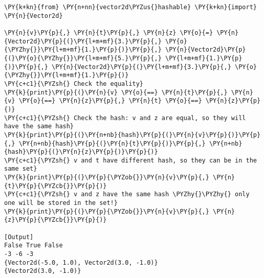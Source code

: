 \begin{Verbatim}[label=\makebox{\url{https://github.com/lucabaldini/cmepda/tree/master/slides/latex/snippets/vector2d\_hashable\_test.py}},commandchars=\\\{\}]
\PY{k+kn}{from} \PY{n+nn}{vector2d\PYZus{}hashable} \PY{k+kn}{import} \PY{n}{Vector2d}
     
\PY{n}{v}\PY{p}{,} \PY{n}{t}\PY{p}{,} \PY{n}{z} \PY{o}{=} \PY{n}{Vector2d}\PY{p}{(}\PY{l+m+mf}{3.}\PY{p}{,} \PY{o}{\PYZhy{}}\PY{l+m+mf}{1.}\PY{p}{)}\PY{p}{,} \PY{n}{Vector2d}\PY{p}{(}\PY{o}{\PYZhy{}}\PY{l+m+mf}{5.}\PY{p}{,} \PY{l+m+mf}{1.}\PY{p}{)}\PY{p}{,} \PY{n}{Vector2d}\PY{p}{(}\PY{l+m+mf}{3.}\PY{p}{,} \PY{o}{\PYZhy{}}\PY{l+m+mf}{1.}\PY{p}{)}
\PY{c+c1}{\PYZsh{} Check the equality}
\PY{k}{print}\PY{p}{(}\PY{n}{v} \PY{o}{==} \PY{n}{t}\PY{p}{,} \PY{n}{v} \PY{o}{==} \PY{n}{z}\PY{p}{,} \PY{n}{t} \PY{o}{==} \PY{n}{z}\PY{p}{)}
\PY{c+c1}{\PYZsh{} Check the hash: v and z are equal, so they will have the same hash}
\PY{k}{print}\PY{p}{(}\PY{n+nb}{hash}\PY{p}{(}\PY{n}{v}\PY{p}{)}\PY{p}{,} \PY{n+nb}{hash}\PY{p}{(}\PY{n}{t}\PY{p}{)}\PY{p}{,} \PY{n+nb}{hash}\PY{p}{(}\PY{n}{z}\PY{p}{)}\PY{p}{)}
\PY{c+c1}{\PYZsh{} v and t have different hash, so they can be in the same set}
\PY{k}{print}\PY{p}{(}\PY{p}{\PYZob{}}\PY{n}{v}\PY{p}{,} \PY{n}{t}\PY{p}{\PYZcb{}}\PY{p}{)}
\PY{c+c1}{\PYZsh{} v and z have the same hash \PYZhy{}\PYZhy{} only one will be stored in the set!}
\PY{k}{print}\PY{p}{(}\PY{p}{\PYZob{}}\PY{n}{v}\PY{p}{,} \PY{n}{z}\PY{p}{\PYZcb{}}\PY{p}{)}

[Output]
False True False
-3 -6 -3
{Vector2d(-5.0, 1.0), Vector2d(3.0, -1.0)}
{Vector2d(3.0, -1.0)}
\end{Verbatim}